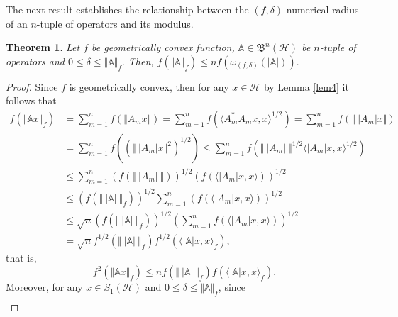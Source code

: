 \documentclass[12pt]{article}
\newtheorem{theorem}{Theorem}
\begin{document}
The next result establishes the relationship between the $(f,\delta)$-numerical radius of an $n$-tuple of operators and its modulus.
\begin{theorem}
\label{thm3}
Let $ f $ be geometrically convex function, $ \mathbb{A} \in \mathfrak{B}^{n}(\mathcal{H}) $ be $n$-tuple of operators and
$0 \leq \delta \leq \Vert \mathbb{A}\Vert_f.$ Then,
\(
f\left( \Vert \mathbb{A} \Vert_{f} \right)
\leq n
f\left( \omega_{(f,\delta )}( \vert \mathbb{A} \vert )\right)
.
\)
\end{theorem}
\begin{proof}
Since $f$ is geometrically convex, then
for any $x \in \mathcal{H}$ by Lemma \ref{lem4} it follows that
\begin{align*}
f(\Vert\mathbb{A}x\Vert_f)
&= \sum\limits_{m=1}^n f(\Vert A_m x \Vert) = \sum\limits_{m=1}^n f\left( \langle A_m^*A_m x, x \rangle^{1/2} \right) = \sum\limits_{m=1}^n f\left( \Vert \ \vert A_m \vert x \Vert \right) \\
&= \sum\limits_{m=1}^n f\left( \left( \Vert \ \vert A_m \vert x \Vert^{2} \right)^{1/2} \right)  \leq \sum\limits_{m=1}^n f\left( \Vert \ \vert A_m \vert \ \Vert^{1/2} \langle \vert A_{m} \vert x,x \rangle^{1/2}\right)  \\
&\leq \sum\limits_{m=1}^n \left( f\left( \Vert \ \vert A_m \vert \ \Vert\right)\right)  ^{1/2} \left( f \left( \langle \vert A_{m} \vert x,x \rangle\right)\right) ^{1/2} \\
&\leq \left( f\left( \Vert \ \vert \mathbb{A} \vert \ \Vert_{f} \right)  \right) ^{1/2} \sum\limits_{m=1}^{n} \left( f\left( \langle \vert A_{m} \vert x,x \rangle \right)  \right) ^{1/2} \\
&\leq \sqrt{n} \left( f  \left( \Vert \ \vert \mathbb{A} \vert \ \Vert_{f} \right)\right)^{1/2} \left( \sum\limits_{m=1}^n f \left( \langle \vert A_{m} \vert x,x \rangle \right) \right) ^{1/2} \\
&= \sqrt{n} f^{1/2} \left( \Vert \ \vert \mathbb{A} \vert \ \Vert_{f} \right)f^{1/2}\left( \langle \vert \mathbb{A} \vert x,x \rangle_{f} \right),
\end{align*}
that is,
\begin{equation}
\label{equ14}
f^{2}(\Vert\mathbb{A}x\Vert_f)\leq n f\left( \Vert \ \vert \mathbb{A} \ \vert \Vert_{f} \right)f\left( \langle \vert \mathbb{A} \vert x,x \rangle_{f} \right).
\end{equation}
Moreover, for any $ x\in S_{1}(\mathcal{H}) $ and $ 0\leq \delta \leq \Vert \mathbb{A} \Vert_{f} $, since
\begin{multline*}

\end{multline*}
\end{proof}
\end{document}
